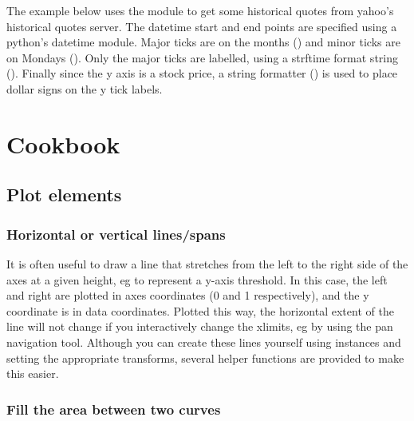 \documentclass[twoside]{book}
\begin{document}
The example below uses the  module to get
some historical quotes from yahoo's historical quotes server.  The
datetime start and end points are specified using a python's datetime
module.  Major ticks are on the months () and minor
ticks are on Mondays ().  Only the major ticks
are labelled, using a strftime format string ().
Finally since the y axis is a stock price, a string formatter
() is used to place dollar signs on the y
tick labels.









\chapter{Cookbook}
\label{cha:cookbook}

\section{Plot elements}

\subsection{Horizontal or vertical lines/spans}
\label{cbook:axhv_line_span}

It is often useful to draw a line that stretches from the left to the
right side of the axes at a given height, eg to represent a y-axis
threshold.  In this case, the left and right are plotted in axes
coordinates (0 and 1 respectively), and the y coordinate is in data
coordinates.  Plotted this way, the horizontal extent of the line will
not change if you interactively change the xlimits, eg by using the
pan navigation tool.  Although you can create these lines yourself
using  instances and setting the
appropriate transforms, several helper functions are provided to make
this easier.

\subsection{Fill the area between two curves}
\label{cbook:fill_between}
\end{document}
